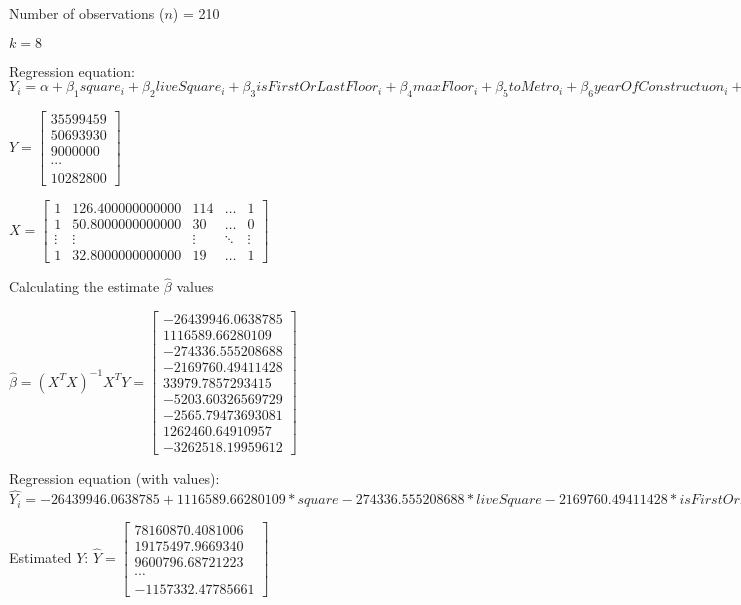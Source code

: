 \documentclass{article}
\begin{document}
Number of observations ($n$) = 210

$k=8$

Regression equation: 
$Y_i=\alpha+\beta_1square_i+\beta_2liveSquare_i+\beta_3isFirstOrLastFloor_i+\beta_4maxFloor_i+\beta_5toMetro_i+\beta_6yearOfConstructuon_i+\beta_7hasElevator_i+\beta_8isNovostroyka_i$


$Y=\left[\begin{matrix}35599459\\50693930\\9000000\\\cdots\\10282800\end{matrix}\right]$


$X=\begin{bmatrix}1 & 126.400000000000 & 114 & \dots  & 1 \\ 1 & 50.8000000000000 & 30 & \dots  & 0 \\ \vdots & \vdots & \vdots & \ddots & \vdots \\ 1 & 32.8000000000000 & 19 & \dots  & 1\end{bmatrix}$

Calculating the estimate $\hat\beta$ values

$\hat{\beta}=(X^TX)^{-1}X^TY=\left[\begin{matrix}-26439946.0638785\\1116589.66280109\\-274336.555208688\\-2169760.49411428\\33979.7857293415\\-5203.60326569729\\-2565.79473693081\\1262460.64910957\\-3262518.19959612\end{matrix}\right]$

Regression equation (with values): $\hat{Y_i}=-26439946.0638785+1116589.66280109*square-274336.555208688*liveSquare-2169760.49411428*isFirstOrLastFloor+33979.7857293415*maxFloor-5203.60326569729*toMetro-2565.79473693081*yearOfConstructuon+1262460.64910957*hasElevator-3262518.19959612*isNovostroyka$


Estimated $Y$: $\hat{Y}=\left[\begin{matrix}78160870.4081006\\19175497.9669340\\9600796.68721223\\\cdots\\-1157332.47785661\end{matrix}\right]$
\end{document}
